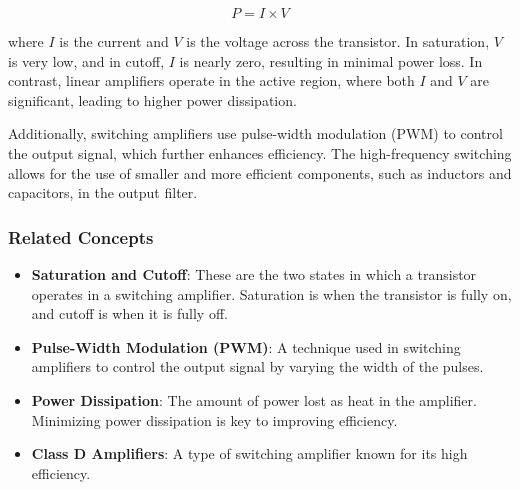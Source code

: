 \[
P = I \times V
\]

where \( I \) is the current and \( V \) is the voltage across the transistor. In saturation, \( V \) is very low, and in cutoff, \( I \) is nearly zero, resulting in minimal power loss. In contrast, linear amplifiers operate in the active region, where both \( I \) and \( V \) are significant, leading to higher power dissipation.

Additionally, switching amplifiers use pulse-width modulation (PWM) to control the output signal, which further enhances efficiency. The high-frequency switching allows for the use of smaller and more efficient components, such as inductors and capacitors, in the output filter.

\subsubsection{Related Concepts}
\begin{itemize}
    \item \textbf{Saturation and Cutoff}: These are the two states in which a transistor operates in a switching amplifier. Saturation is when the transistor is fully on, and cutoff is when it is fully off.
    \item \textbf{Pulse-Width Modulation (PWM)}: A technique used in switching amplifiers to control the output signal by varying the width of the pulses.
    \item \textbf{Power Dissipation}: The amount of power lost as heat in the amplifier. Minimizing power dissipation is key to improving efficiency.
    \item \textbf{Class D Amplifiers}: A type of switching amplifier known for its high efficiency.
\end{itemize}

